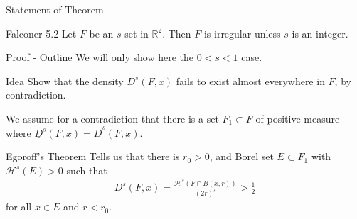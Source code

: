 \documentclass[10pt]{beamer}
\begin{document}
\begin{frame}[t]{Statement of Theorem}
	\begin{theorem}{Falconer 5.2}
	Let \(F\) be an \(s\)-set in \(\mathbb{R}^2\). Then \(F\) is irregular unless \(s\) is an integer.
\end{theorem}


\end{frame}

\begin{frame}[t]{Proof - Outline}
We will only show here the \(0<s<1\) case.

\begin{block}{Idea}
	Show that the density \(D^{s}(F,x)\) fails to exist almost everywhere in \(F\), by contradiction.
\end{block}
We assume for a contradiction that there is a set \(F_1\subset F\) of positive measure where \(\underline{D}^{s}(F,x) = \overline{D}^{s}(F,x)\).

\vspace{15mm}



\begin{block}{Egoroff's Theorem}
	Tells us that there is \(r_0 > 0\), and Borel set \(E\subset F_1\) with \(\mathcal{H}^{s}(E) > 0\) such that
	\begin{align*}
		D^{s}(F,x) = \frac{\mathcal{H}^{s}(F\cap B(x,r))}{(2r)^{s}} > \frac{1}{2}
	\end{align*}
	for all \(x \in E\) and \(r<r_0\).
\end{block}
\end{frame}
\end{document}
